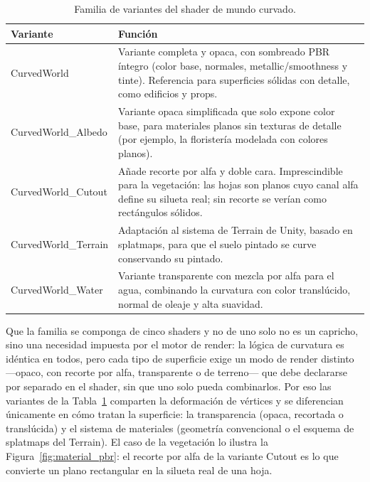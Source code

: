 \documentclass[12pt,twoside,titlepage]{report}
\begin{document}
\begin{table}[h]
  \centering
  \caption{Familia de variantes del shader de mundo curvado.}
  \label{tab:variantes_curved}
  \begin{footnotesize}
  \renewcommand{\arraystretch}{1.3}
  \begin{tabular}{p{3.2cm}p{10cm}}
    \hline
    \textbf{Variante} & \textbf{Función} \\
    \hline
    CurvedWorld & Variante completa y opaca, con sombreado PBR íntegro (color base, normales, metallic/smoothness y tinte). Referencia para superficies sólidas con detalle, como edificios y props. \\
    \hline
    CurvedWorld\_Albedo & Variante opaca simplificada que solo expone color base, para materiales planos sin texturas de detalle (por ejemplo, la floristería modelada con colores planos). \\
    \hline
    CurvedWorld\_Cutout & Añade recorte por alfa y doble cara. Imprescindible para la vegetación: las hojas son planos cuyo canal alfa define su silueta real; sin recorte se verían como rectángulos sólidos. \\
    \hline
    CurvedWorld\_Terrain & Adaptación al sistema de Terrain de Unity, basado en splatmaps, para que el suelo pintado se curve conservando su pintado. \\
    \hline
    CurvedWorld\_Water & Variante transparente con mezcla por alfa para el agua, combinando la curvatura con color translúcido, normal de oleaje y alta suavidad. \\
    \hline
  \end{tabular}
  \end{footnotesize}
\end{table}

Que la familia se componga de cinco shaders y no de uno solo no es un capricho, sino una necesidad impuesta por el motor de render: la lógica de curvatura es idéntica en todos, pero cada tipo de superficie exige un modo de render distinto ---opaco, con recorte por alfa, transparente o de terreno--- que debe declararse por separado en el shader, sin que uno solo pueda combinarlos. Por eso las variantes de la Tabla~\ref{tab:variantes_curved} comparten la deformación de vértices y se diferencian únicamente en cómo tratan la superficie: la transparencia (opaca, recortada o translúcida) y el sistema de materiales (geometría convencional o el esquema de splatmaps del Terrain). El caso de la vegetación lo ilustra la Figura~\ref{fig:material_pbr}: el recorte por alfa de la variante Cutout es lo que convierte un plano rectangular en la silueta real de una hoja.
\end{document}
